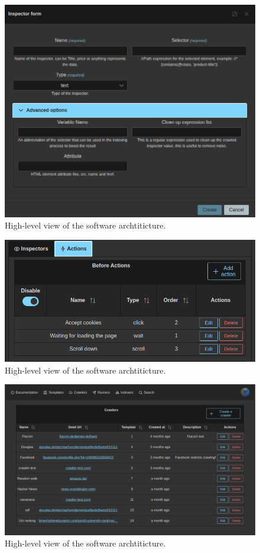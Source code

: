 \begin{figure}[h]	
     \centering
     \includegraphics[width=13cm]{images/demo-4.png}
     \caption{High-level view of the software archtiticture.}
     \label{fig:software-arch}
\end{figure}

\begin{figure}[h]	
     \centering
     \includegraphics[width=13cm]{images/demo-5.png}
     \caption{High-level view of the software archtiticture.}
     \label{fig:software-arch}
\end{figure}

\begin{figure}[h]	
     \centering
     \includegraphics[width=13cm]{images/demo-6.png}
     \caption{High-level view of the software archtiticture.}
     \label{fig:software-arch}
\end{figure}


